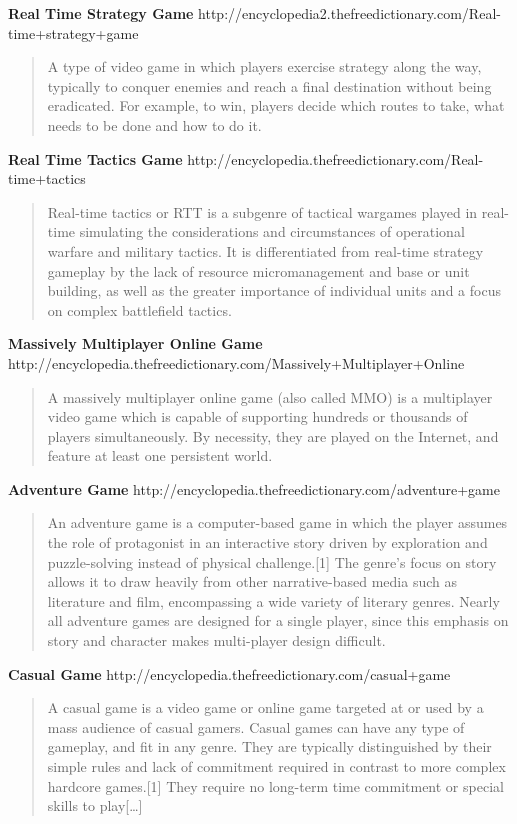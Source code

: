 \documentclass{article}
\begin{document}

\textbf{Real Time Strategy Game}		
http://encyclopedia2.thefreedictionary.com/Real-time+strategy+game
\begin{quote}
A type of video game in which players exercise strategy along the way, typically
to conquer enemies and reach a final destination without being eradicated. For
example, to win, players decide which routes to take, what needs to be done and
how to do it.
\end{quote}

\textbf{Real Time Tactics Game}
	http://encyclopedia.thefreedictionary.com/Real-time+tactics
\begin{quote}
Real-time tactics or RTT is a subgenre of tactical wargames played in real-time
simulating the considerations and circumstances of operational warfare and
military tactics. It is differentiated from real-time strategy gameplay by the
lack of resource micromanagement and base or unit building, as well as the
greater importance of individual units and a focus on complex battlefield
tactics.
\end{quote}

\textbf{Massively Multiplayer Online Game}		
	http://encyclopedia.thefreedictionary.com/Massively+Multiplayer+Online
\begin{quote}
A massively multiplayer online game (also called MMO) is a multiplayer video
game which is capable of supporting hundreds or thousands of players
simultaneously. By necessity, they are played on the Internet, and feature at
least one persistent world.
\end{quote}
	
\textbf{Adventure Game}		
	http://encyclopedia.thefreedictionary.com/adventure+game
\begin{quote}
An adventure game is a computer-based game in which the player assumes the role
of protagonist in an interactive story driven by exploration and puzzle-solving
instead of physical challenge.[1] The genre's focus on story allows it to draw
heavily from other narrative-based media such as literature and film,
encompassing a wide variety of literary genres. Nearly all adventure games are
designed for a single player, since this emphasis on story and character makes
multi-player design difficult.
\end{quote}

\textbf{Casual Game}		
	http://encyclopedia.thefreedictionary.com/casual+game
\begin{quote}
A casual game is a video game or online game targeted at or used by a mass
audience of casual gamers. Casual games can have any type of gameplay, and fit
in any genre. They are typically distinguished by their simple rules and lack of
commitment required in contrast to more complex hardcore games.[1] They require
no long-term time commitment or special skills to play[\ldots]
\end{quote}
\end{document}
